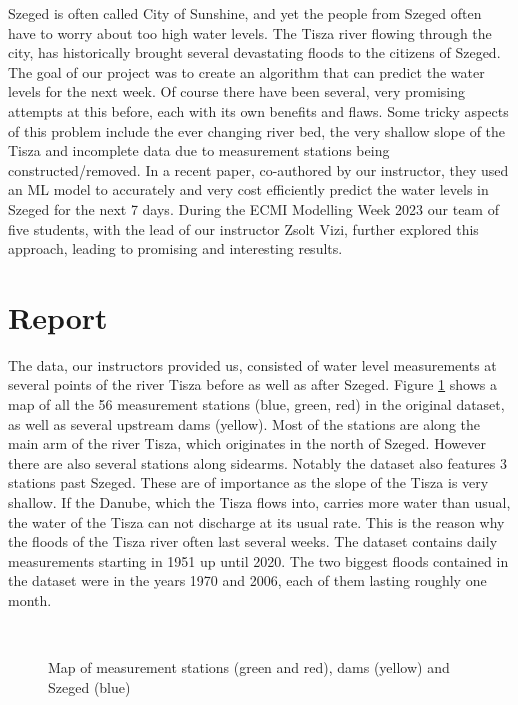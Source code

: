 \documentclass{article}
\begin{document}
Szeged is often called City of Sunshine, and yet the people from Szeged often
have to worry about too high water levels. The Tisza river flowing
through the city, has historically brought several devastating floods to the
citizens of Szeged. The goal of our project was to create an algorithm that
can predict the water levels for the next week. Of course there have been
several, very promising attempts at this before, each with its own benefits
and flaws. Some tricky aspects of this problem include the ever
changing river bed, the very shallow slope of the Tisza and incomplete data
due to measurement stations being constructed/removed. In a recent
paper{\cite{WaterLevel2023}}, co-authored by our instructor, they used an ML
model to accurately and very cost efficiently predict the water levels in
Szeged for the next 7 days. During the ECMI Modelling Week 2023 our team of
five students, with the lead of our instructor Zsolt Vizi, further explored
this approach, leading to promising and interesting results.

\section{Report}

The data, our instructors provided us, consisted of water level
measurements at several points of the river Tisza before as well as after
Szeged. Figure \ref{map} shows a map of all the 56 measurement stations (blue,
green, red) in the original dataset, as well as several upstream dams
(yellow). Most of the stations are along the main arm of the river Tisza,
which originates in the north of Szeged. However there are also several
stations along sidearms. Notably the dataset also features 3 stations past
Szeged. These are of importance as the slope of the Tisza is very shallow. If
the Danube, which the Tisza flows into, carries more water than usual, the
water of the Tisza can not discharge at its usual rate. This is the reason why
the floods of the Tisza river often last several weeks. The dataset contains
daily measurements starting in 1951 up until 2020. The two biggest floods
contained in the dataset were in the years 1970 and 2006, each of them lasting
roughly one month.

\

\begin{figure}[h]
  \caption{Map of measurement stations (green and red), dams (yellow) and
  Szeged (blue)\label{map}}
\end{figure}
\end{document}
